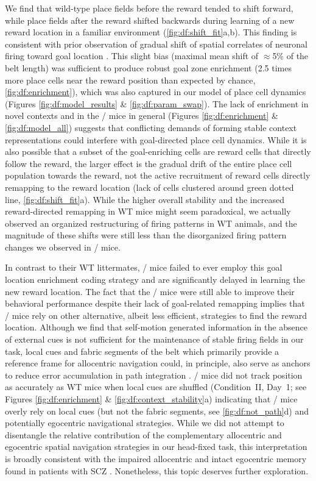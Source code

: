 We find that wild-type place fields before the reward tended to shift forward, while place fields after the reward shifted backwards during learning of a new reward location in a familiar environment (\autoref{fig:df:shift_fit}a,b). This finding is consistent with prior observation of gradual shift of spatial correlates of neuronal firing toward goal location \citep{Lee2006}. This slight bias (maximal mean shift of $\approx$5\% of the belt length) was sufficient to produce robust goal zone enrichment (2.5 times more place cells near the reward position than expected by chance, \autoref{fig:df:enrichment}), which was also captured in our model of place cell dynamics (Figures \ref{fig:df:model_results} \& \ref{fig:df:param_swap}). The lack of enrichment in novel contexts and in the \df/ mice in general (Figures \ref{fig:df:enrichment} \& \ref{fig:df:model_all}) suggests that conflicting demands of forming stable context representations could interfere with goal-directed place cell dynamics.  While it is also possible that a subset of the goal-enriching cells are reward cells that directly follow the reward, the larger effect is the gradual drift of the entire place cell population towards the reward, not the active recruitment of reward cells directly remapping to the reward location (lack of cells clustered around green dotted line, \autoref{fig:df:shift_fit}a). While the higher overall stability and the increased reward-directed remapping in WT mice might seem paradoxical, we actually observed an organized restructuring of firing patterns in WT animals, and the magnitude of these shifts were still less than the disorganized firing pattern changes we observed in \df/ mice.

In contrast to their WT littermates, \df/ mice failed to ever employ this goal location enrichment coding strategy and are significantly delayed in learning the new reward location. The fact that the \df/ mice were  still able to improve their behavioral performance despite their lack of goal-related remapping implies that \df/ mice rely on other alternative, albeit less efficient, strategies to find the reward location. Although we find that self-motion generated information in the absence of external cues is not sufficient for the maintenance of stable firing fields in our task, local cues and fabric segments of the belt which primarily provide a reference frame for allocentric navigation could, in principle, also serve as anchors to reduce error accumulation in path integration \citep{Etienne2004, Gothard1996}. \df/ mice did not track position as accurately as WT mice when local cues are shuffled (Condition~II, Day~1; see Figures \ref{fig:df:enrichment} \& \ref{fig:df:context_stability}a) indicating that \df/ mice overly rely on local cues (but not the fabric segments, see \autoref{fig:df:not_path}d) and potentially egocentric navigational strategies. While we did not attempt to disentangle the relative contribution of the complementary allocentric and egocentric spatial navigation strategies in our head-fixed task, this interpretation is broadly consistent with the impaired allocentric and intact egocentric memory found in patients with SCZ \citep{Agarwal2015, Weniger2008}.  Nonetheless, this topic deserves further exploration.

